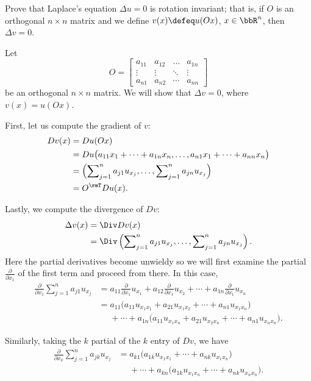 \begin{problem}
  Prove that Laplace's equation \(\Delta u=0\) is rotation invariant; that
  is, if \(O\) is an orthogonal \(n\times n\) matrix and we define
  \(v(x)\defeq u(Ox)\), \(x\in\bbR^n\), then \(\Delta v=0\).
\end{problem}
\begin{solution}
  Let
  \[
    O=
    \begin{bmatrix}
      a_{11}&a_{12}&\dotsc&a_{1n}\\
      \vdots&\vdots&\ddots&\vdots\\
      a_{n1}&a_{n2}&\cdots&a_{nn}
    \end{bmatrix}
  \]
  be an orthogonal \(n\times n\) matrix. We will show that \(\Delta v=0\),
  where \(v(x)=u(Ox)\).

  First, let us compute the gradient of \(v\):
  \begin{align*}
    Dv(x)
    &=Du(Ox)\\
    &=Du\bigl(a_{11}x_1+\dotsb+a_{1n}x_n,\dotsc,a_{n1}x_1+\dotsb+a_{nn}x_n\bigr)\\
    &=\left(\sum\nolimits_{j=1}^na_{j1}u_{x_j},%
      \dotsc,%
      \sum\nolimits_{j=1}^n a_{jn}u_{x_j}\right)\\
    &=O^\rmT Du(x).
  \end{align*}

  Lastly, we compute the divergence of \(Dv\):
  \begin{align*}
    \Delta v(x)
    &=\Div Dv(x)\\
    &=\Div%
      \left(\sum\nolimits_{j=1}^na_{j1}u_{x_j},%
      \dotsc,%
      \sum\nolimits_{j=1}^n a_{jn}u_{x_j}\right).
  \end{align*}
  Here the partial derivatives become unwieldy so we will first examine the
  partial \(\frac{\partial}{\partial x_1}\) of the first term and proceed
  from there. In this case,
  \begin{align*}
    \frac{\partial}{\partial x_1}\sum_{j=1}^n a_{j1}u_{x_j}
    &=a_{11}\tfrac{\partial}{\partial
      x_1}u_{x_1}+a_{12}\tfrac{\partial}{\partial
      x_1}u_{x_2}+\dotsb+a_{1n}\tfrac{\partial}{\partial x_1}u_{x_n}\\
    &=a_{11}\bigl(a_{11}u_{x_1x_1}+a_{21}u_{x_1x_2}+\dotsb+a_{n1}u_{x_1x_n}\bigr)\\
    &\phantom{{}={}}+\dotsb+a_{1n}\bigl(a_{11}u_{x_1x_n}+a_{21}u_{x_2x_n}
      +\dotsb+a_{n1}u_{x_nx_n}\bigr).
  \end{align*}

  Similarly, taking the \(k\) partial of the \(k\)
  entry of \(Dv\), we have
  \begin{equation}
    \label{eq:5:laplacian-k-part}
    \begin{aligned}
      \frac{\partial}{\partial x_k}\sum_{j=1}^n a_{jk}u_{x_j}
      &=a_{k1}\bigl(a_{1k}u_{x_1x_1}+\dotsb+a_{nk}u_{x_1x_n}\bigr)\\
      &\phantom{{}={}}+\dotsb+a_{kn}
      \bigl(a_{1k}u_{x_1x_n}+\dotsb+a_{nk}u_{x_nx_n}\bigr).
    \end{aligned}
  \end{equation}


\end{solution}
